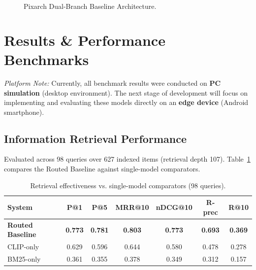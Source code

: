 \documentclass[10.5pt,twocolumn]{article}
\begin{document}
\begin{figure}[htbp]
{%
}
\caption{Pixarch Dual-Branch Baseline Architecture.}
\label{fig:arch}
\end{figure}

\section{Results \& Performance Benchmarks}
\textit{Platform Note:} Currently, all benchmark results were conducted on \textbf{PC simulation} (desktop environment). The next stage of development will focus on implementing and evaluating these models directly on an \textbf{edge device} (Android smartphone).

\subsection{Information Retrieval Performance}
Evaluated across 98 queries over 627 indexed items (retrieval depth 107). Table~\ref{tab:retrieval} compares the Routed Baseline against single-model comparators.

\begin{table}[htbp]
\centering
\scriptsize
\setlength{\tabcolsep}{2.0pt}
\begin{tabular}{lcccccc}
\toprule
\textbf{System} & \textbf{P@1} & \textbf{P@5} & \textbf{MRR@10} & \textbf{nDCG@10} & \textbf{R-prec} & \textbf{R@10} \\
\midrule
\textbf{Routed Baseline} & \textbf{0.773} & \textbf{0.781} & \textbf{0.803} & \textbf{0.773} & \textbf{0.693} & \textbf{0.369} \\
CLIP-only & 0.629 & 0.596 & 0.644 & 0.580 & 0.478 & 0.278 \\
BM25-only & 0.361 & 0.355 & 0.378 & 0.349 & 0.312 & 0.157 \\
\bottomrule
\end{tabular}
\caption{Retrieval effectiveness vs. single-model comparators (98 queries).}
\label{tab:retrieval}
\end{table}
\end{document}
